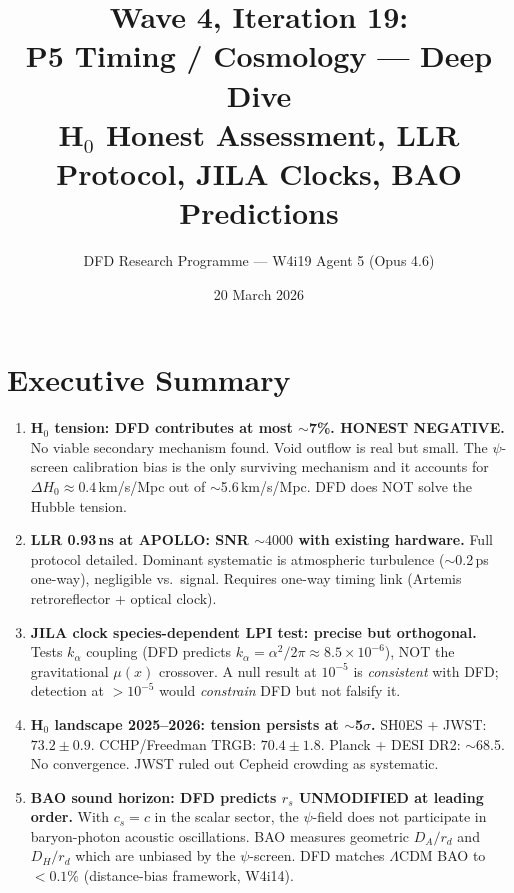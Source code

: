 \documentclass[11pt]{article}
\title{\textbf{Wave 4, Iteration 19:}\\
\textbf{P5 Timing / Cosmology --- Deep Dive}\\[6pt]
{\large H$_0$ Honest Assessment, LLR Protocol, JILA Clocks, BAO Predictions}}
\author{DFD Research Programme --- W4i19 Agent 5 (Opus 4.6)}
\date{20 March 2026}
\begin{document}
\maketitle

\section*{Executive Summary}

\begin{tcolorbox}[colback=yellow!5!white, colframe=yellow!70!black,
  title=\textbf{W4i19: FIVE KEY FINDINGS}]

\begin{enumerate}
\item \textbf{H$_0$ tension: DFD contributes at most $\sim$7\%. HONEST NEGATIVE.}
  No viable secondary mechanism found. Void outflow is real but small.
  The $\psi$-screen calibration bias is the only surviving mechanism and
  it accounts for $\Delta H_0 \approx 0.4$\,km/s/Mpc out of $\sim$5.6\,km/s/Mpc.
  DFD does NOT solve the Hubble tension.

\item \textbf{LLR 0.93\,ns at APOLLO: SNR $\sim 4000$ with existing hardware.}
  Full protocol detailed. Dominant systematic is atmospheric turbulence
  ($\sim$0.2\,ps one-way), negligible vs.\ signal. Requires one-way
  timing link (Artemis retroreflector + optical clock).

\item \textbf{JILA clock species-dependent LPI test: precise but orthogonal.}
  Tests $k_\alpha$ coupling (DFD predicts $k_\alpha = \alpha^2/2\pi \approx
  8.5 \times 10^{-6}$), NOT the gravitational $\mu(x)$ crossover. A null
  result at $10^{-5}$ is \emph{consistent} with DFD; detection at $>10^{-5}$
  would \emph{constrain} DFD but not falsify it.

\item \textbf{H$_0$ landscape 2025--2026: tension persists at $\sim$5$\sigma$.}
  SH0ES + JWST: $73.2 \pm 0.9$. CCHP/Freedman TRGB: $70.4 \pm 1.8$.
  Planck + DESI DR2: $\sim$68.5. No convergence. JWST ruled out
  Cepheid crowding as systematic.

\item \textbf{BAO sound horizon: DFD predicts $r_s$ UNMODIFIED at leading order.}
  With $c_s = c$ in the scalar sector, the $\psi$-field does not participate
  in baryon-photon acoustic oscillations. BAO measures geometric $D_A/r_d$
  and $D_H/r_d$ which are unbiased by the $\psi$-screen. DFD matches
  $\Lambda$CDM BAO to $<0.1\%$ (distance-bias framework, W4i14).
\end{enumerate}
\end{tcolorbox}
\end{document}
